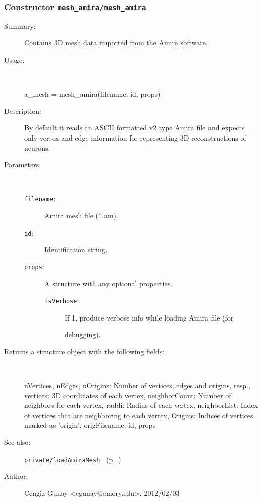 \subsubsection[Constructor \texttt{mesh\_amira}]{Constructor \texttt{mesh\_amira/mesh\_amira}}%
%
\label{ref_mesh_amira__mesh_amira}%
\hypertarget{ref_mesh_amira__mesh_amira}{}%
\begin{description}
\item[Summary:]Contains 3D mesh data imported from the Amira software.
%
\item[Usage:]~%
\begin{lyxcode}%
a\_mesh = mesh\_amira(filename, id, props)
%
\end{lyxcode}%
%
\item[Description:]%
By default it reads an ASCII formatted v2 type Amira file and expects
 only vertex and edge information for representing 3D reconstructions
 of neurons.
\item[Parameters:]~
\begin{description}%
\item[\texttt{filename}:]
 Amira mesh file (*.am).
\item[\texttt{id}:]
 Identification string.
\item[\texttt{props}:]
 A structure with any optional properties.
\begin{description}%
\item[\texttt{isVerbose}:]
 If 1, produce verbose info while loading Amira file (for

debugging).
\end{description}%
\end{description}%
%
\item[Returns a structure object with the following fields:
]~

   nVertices, nEdges, nOrigins: Number of vertices, edges and origins, resp.,
   vertices: 3D coordinates of each vertex,
   neighborCount: Number of neighbors for each vertex,
   raddi: Radius of each vertex,
   neighborList: Index of vertices that are neighboring to each vertex,
   Origins: Indices of vertices marked as 'origin',
   origFilename, id, props
%
%
\item[See also:]%
\hyperlink{ref_private__loadAmiraMesh}{\texttt{private/loadAmiraMesh}}%
\ (p.~\pageref{ref_private__loadAmiraMesh})%
%
%
\item[Author:]%
Cengiz Gunay <cgunay@emory.edu>, 2012/02/03
%
\end{description}
\methodline%
